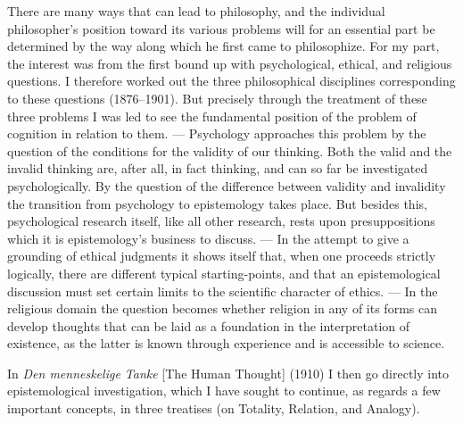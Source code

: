 \documentclass[12pt]{book}
\newcommand{\opage}[1]{\marginnote{\footnotesize\textit{[#1]}}}
\begin{document}
There are many ways that can lead to philosophy, and the individual philosopher's position
toward its various problems will for an essential part be determined by the way along which he
first came to philosophize. For my part, the interest was from the first bound up with
psychological, ethical, and religious questions. I therefore worked out the three philosophical
disciplines corresponding to these questions (1876--1901). But precisely through the treatment
of these three problems I was led to see the fundamental position of the problem of cognition in
relation to them. --- Psychology approaches this problem by the question of the conditions for
the validity of our thinking. Both the valid and the invalid thinking are, after all, in fact
thinking, and can so far be investigated psychologically. By the question of the difference
between validity and invalidity the transition from psychology to epistemology takes place. \opage{6}But
besides this, psychological research itself, like all other research, rests upon presuppositions
which it is epistemology's business to discuss. --- In the attempt to give a grounding of
ethical judgments it shows itself that, when one proceeds strictly logically, there are
different typical starting-points, and that an epistemological discussion must set certain
limits to the scientific character of ethics. --- In the religious domain the question becomes
whether religion in any of its forms can develop thoughts that can be laid as a foundation in
the interpretation of existence, as the latter is known through experience and is accessible to
science.

In \textit{Den menneskelige Tanke} [The Human Thought] (1910) I then go directly into
epistemological investigation, which I have sought to continue, as regards a few important
concepts, in three treatises (on Totality, Relation, and Analogy).
\end{document}
